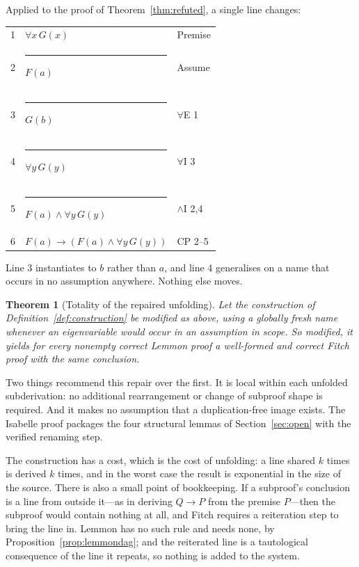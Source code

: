 \documentclass[11pt]{article}
\makeatletter
\theoremstyle{plain}
\newtheorem{theorem}{Theorem}
\theoremstyle{definition}
\theoremstyle{remark}
\newcommand{\fbar}{\rule[-0.7ex]{0.4pt}{2.6ex}\hspace{0.7em}}
\newenvironment{fitchproof}
  {\begin{center}\begin{tabular}{@{}r@{\hspace{1em}}l@{\hspace{2.5em}}l@{}}}
  {\end{tabular}\end{center}}
\makeatother
\begin{document}
Applied to the proof of Theorem~\ref{thm:refuted}, a single line changes:

\begin{fitchproof}
1 &                 $\forall x\, G(x)$ & Premise \\
2 & \fbar           $F(a)$             & Assume \\
3 & \fbar           $G(b)$             & $\forall$E 1 \\
4 & \fbar           $\forall y\, G(y)$ & $\forall$I 3 \\
5 & \fbar           $F(a) \wedge \forall y\, G(y)$ & $\wedge$I 2,4 \\
6 &                 $F(a) \to (F(a) \wedge \forall y\, G(y))$ & CP 2--5 \\
\end{fitchproof}

\noindent Line 3 instantiates to $b$ rather than $a$, and line 4 generalises
on a name that occurs in no assumption anywhere. Nothing else moves.

\begin{theorem}[Totality of the repaired unfolding]\label{conj:total}
Let the construction of Definition~\ref{def:construction} be modified as
above, using a globally fresh name whenever an eigenvariable would occur in an
assumption in scope. So modified, it yields for every nonempty correct Lemmon
proof a well-formed and correct Fitch proof with the same conclusion.
\end{theorem}

Two things recommend this repair over the first. It is local within each
unfolded subderivation: no additional rearrangement or change of subproof shape
is required. And it makes no assumption that a duplication-free image exists.
The Isabelle proof packages the four structural lemmas of
Section~\ref{sec:open} with the verified renaming step.

The construction has a cost, which is the cost of unfolding: a line shared $k$
times is derived $k$ times, and in the worst case the result is exponential in
the size of the source. There is also a small point of bookkeeping. If a
subproof's conclusion is a line from outside it---as in deriving $Q \to P$
from the premise $P$---then the subproof would contain nothing at all, and
Fitch requires a reiteration step to bring the line in. Lemmon has no such
rule and needs none, by Proposition~\ref{prop:lemmondag}; and the reiterated
line is a tautological consequence of the line it repeats, so nothing is added
to the system.
\end{document}
